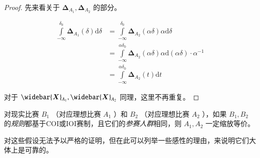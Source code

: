         \begin{proof}
            先来看关于 $\bm{\Delta}_{A_1},\bm{\Delta}_{A_2}$ 的部分。

            \begin{align*}
                \int\limits_{-\infty}^{\delta_0} \bm{\Delta}_{A_1}(\delta)\mathrm{d}\delta 
                &=\int\limits_{-\infty}^{\delta_0} \bm{\Delta}_{A_2}(\alpha\delta)\alpha\mathrm{d}\delta \\
                &=\int\limits_{-\infty}^{\alpha\delta_0} \bm{\Delta}_{A_2}(\alpha\delta)\alpha \mathrm{d}(\alpha\delta)\cdot\alpha^{-1} \\
                &=\int\limits_{-\infty}^{\alpha\delta_0}\bm{\Delta}_{A_2}(t)\mathrm{d}t
            \end{align*}

            对于 $\widebar{\bm{X}}_{A_1},\widebar{\bm{X}}_{A_2}$ 同理，这里不再重复。

        \end{proof}

        \begin{assumption}
            对现实比赛 $B_1$ （对应理想比赛 $A_1$ ）和 $B_2$ （对应理想比赛 $A_2$ ），如果 $B_1,B_2$ 的\emph{规则}都基于COI或IOI赛制，且它们的\emph{参赛人群}相同，则 $A_1,A_2$ 一定缩放等价。
            \label{ass:equivalenceBetweenCodingContests}
        \end{assumption}

        对这些假设无法予以严格的证明，但在此可以列举一些感性的理由，来说明它们大体上是可靠的。


